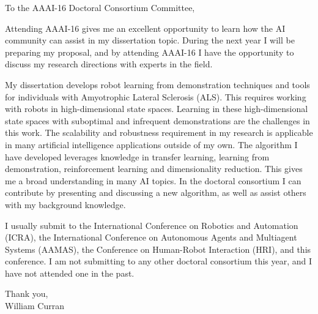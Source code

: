 \documentclass[10pt,a4paper]{letter}
\begin{document}
 
\begin{letter}{} 
\opening{To the AAAI-16 Doctoral Consortium Committee,} 
Attending AAAI-16 gives me an excellent opportunity to learn how the AI community can assist in my dissertation topic. During the next year I will be preparing my proposal, and by attending AAAI-16 I have the opportunity to discuss my research directions with experts in the field. 

My dissertation develops robot learning from demonstration techniques and tools for individuals with Amyotrophic Lateral Sclerosis (ALS). This requires working with robots in high-dimensional state spaces. Learning in these high-dimensional state spaces with suboptimal and infrequent demonstrations are the challenges in this work. The scalability and robustness requirement in my research is applicable in many artificial intelligence applications outside of my own. The algorithm I have developed leverages knowledge in transfer learning, learning from demonstration, reinforcement learning and dimensionality reduction. This gives me a broad understanding in many AI topics. In the doctoral consortium I can contribute by presenting and discussing a new algorithm, as well as assist others with my background knowledge. 

I usually submit to the International Conference on Robotics and Automation (ICRA), the International Conference on Autonomous Agents and Multiagent Systems (AAMAS), the Conference on Human-Robot Interaction (HRI), and this conference. I am not submitting to any other doctoral consortium this year, and I have not attended one in the past. 

\closing{Thank you, \\
William Curran}
\end{letter} 
\end{document}
